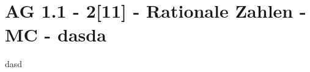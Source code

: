 \section{AG 1.1 - 2[11] - Rationale Zahlen - MC - dasda}

\begin{beispiel}[AG 1.1]{1}
dasd
\end{beispiel}